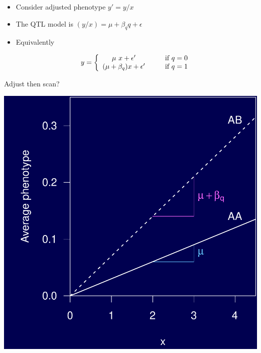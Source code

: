 \documentclass[12pt]{article}
\newcommand{\headsize}{\fontsize{35}{35} \selectfont}
\newcommand{\smallsize}{\fontsize{25}{30} \selectfont}
\begin{document}
\vspace{15mm}

\color{mywhite} \smallsize

\hspace{0.5in} \begin{minipage}{9.5in}
  \begin{itemize}
    \itemsep18pt
  \item Consider adjusted phenotype $y' = y/x$
  \item The QTL model is $(y/x) = \mu + \beta_q q + \epsilon$
  \item Equivalently

$$y = \left\{ \begin{array}{c@{\hspace{1cm}}l} \mu \ x + \epsilon' & \text{if
      $q = 0$} \\
    (\mu + \beta_q) x + \epsilon' & \text{if $q =
      1$} \end{array} \right. $$
\end{itemize}
\end{minipage}


\newpage

\headsize \color{myyellow}
\hfill \begin{minipage}{5.75in}
\centering
Adjust then scan?
\end{minipage}

\vfill

\centerline{\includegraphics{FigsA/y_over_x.pdf}}
\end{document}
